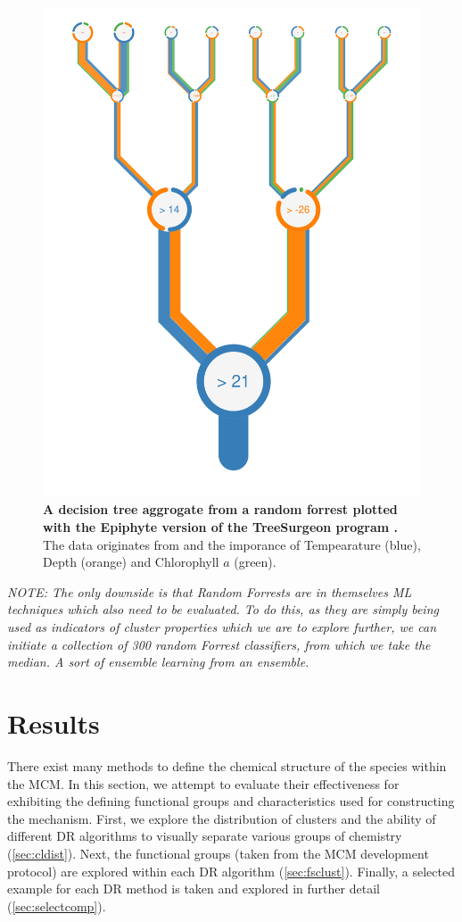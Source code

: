 \begin{figure}[H]
     \centering
         \includegraphics[width=.55\textwidth]{4fig/Oi_prj_features_of_RFR(TEMP+DEPTH+ChlrA)_for_depth_5_white.pdf}
        \caption{\textbf{A decision tree aggrogate from a random forrest plotted with the Epiphyte version of the TreeSurgeon program \citep{forrester}.} The data originates from \cite{iodene} and the imporance of Tempearature (blue), Depth (orange) and Chlorophyll $a$ (green).}
        \label{fig:iodenetree}
\end{figure}


%

\textit{NOTE: The only downside is that Random Forrests are in themselves ML techniques which also need to be evaluated. To do this, as they are simply being used as indicators of cluster properties which we are to explore further, we can initiate a collection of 300 random Forrest classifiers, from which we take the median. A sort of ensemble learning from an ensemble. }


\section{Results}\label{sec:drres}
%
There exist many methods to define the chemical structure of the species within the MCM. In this section, we attempt to evaluate their effectiveness for exhibiting the defining functional groups and characteristics used for constructing the mechanism. First, we explore the distribution of clusters and the ability of different DR algorithms to visually separate various groups of chemistry (\autoref{sec:cldist}). Next, the functional groups (taken from the MCM development protocol) are explored within each DR algorithm (\autoref{sec:fsclust}). Finally, a selected example for each DR method is taken and explored in further detail (\autoref{sec:selectcomp}).

